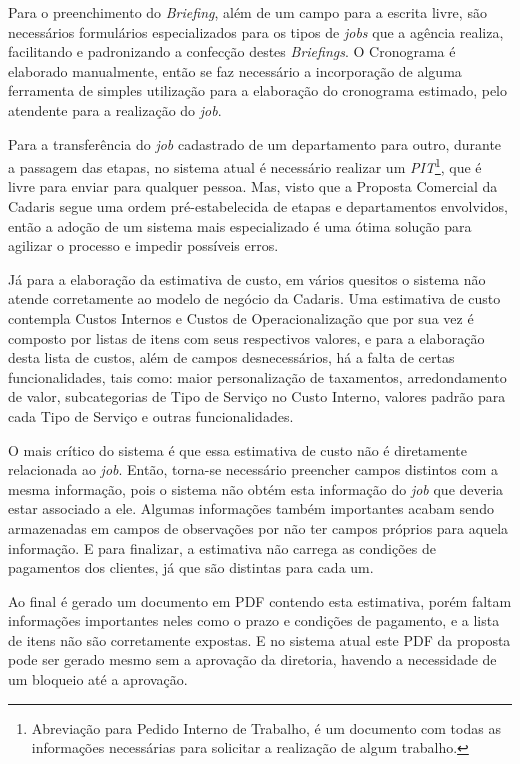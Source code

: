 \documentclass[
  12pt,            %
  openany,
  oneside,
  a4paper,         %
  english,      %
  brazil
]{article}
\numberwithin{figure}{section}
\numberwithin{table}{section}
\begin{document}
Para o preenchimento do \textit{Briefing}, além de um campo para a escrita livre, são necessários formulários especializados para os tipos de \textit{jobs} que a agência realiza, facilitando e padronizando a confecção destes \textit{Briefings}. O Cronograma é elaborado manualmente, então se faz necessário a incorporação de alguma ferramenta de simples utilização para a elaboração do cronograma estimado, pelo atendente para a realização do \textit{job}.

Para a transferência do \textit{job} cadastrado de um departamento para outro, durante a passagem das etapas, no sistema atual é necessário realizar um \textit{PIT}\footnote{Abreviação para Pedido Interno de Trabalho, é um documento com todas as informações necessárias para solicitar a realização de algum trabalho.}, que é livre para enviar para qualquer pessoa. Mas, visto que a Proposta Comercial da Cadaris segue uma ordem pré-estabelecida de etapas e departamentos envolvidos, então a adoção de um sistema mais especializado é uma ótima solução para agilizar o processo e impedir possíveis erros.

Já para a elaboração da estimativa de custo, em vários quesitos o sistema não atende corretamente ao modelo de negócio da Cadaris. Uma estimativa de custo contempla Custos Internos e Custos de Operacionalização que por sua vez é composto por listas de itens com seus respectivos valores, e para a elaboração desta lista de custos, além de campos desnecessários, há a falta de certas funcionalidades, tais como: maior personalização de taxamentos, arredondamento de valor, subcategorias de Tipo de Serviço no Custo Interno, valores padrão para cada Tipo de Serviço e outras funcionalidades.

O mais crítico do sistema é que essa estimativa de custo não é diretamente relacionada ao \textit{job}. Então, torna-se necessário preencher campos distintos com a mesma informação, pois o sistema não obtém esta informação do \textit{job} que deveria estar associado a ele. Algumas informações também importantes acabam sendo armazenadas em campos de observações por não ter campos próprios para aquela informação. E para finalizar, a estimativa não carrega as condições de pagamentos dos clientes, já que são distintas para cada um.

Ao final é gerado um documento em PDF contendo esta estimativa, porém faltam informações importantes neles como o prazo e condições de pagamento, e a lista de itens não são corretamente expostas. E no sistema atual este PDF da proposta pode ser gerado mesmo sem a aprovação da diretoria, havendo a necessidade de um bloqueio até a aprovação.
\end{document}
